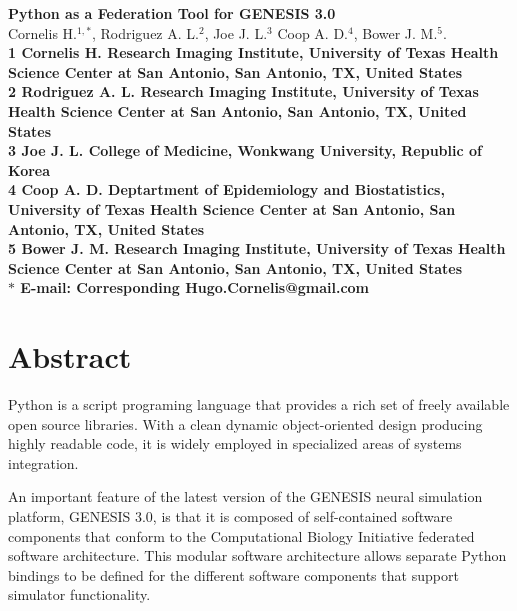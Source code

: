 \documentclass[10pt]{article}
\date{}
\begin{document}
\begin{flushleft}
{\Large
\textbf{Python as a Federation Tool for GENESIS 3.0}
}
\\
Cornelis H.$^{1,\ast}$, 
Rodriguez A. L.$^{2}$, 
Joe J. L.$^{3}$
Coop A. D.$^{4}$,
Bower J. M.$^{5}$.
\\
\bf{1} Cornelis H. Research Imaging Institute, University of Texas Health Science Center at San Antonio, San Antonio, TX, United States
\\
\bf{2} Rodriguez A. L. Research Imaging Institute, University of Texas Health Science Center at San Antonio, San Antonio, TX, United States
\\
\bf{3} Joe J. L. College of Medicine, Wonkwang University, Republic of Korea
\\
\bf{4} Coop A. D. Deptartment of Epidemiology and Biostatistics, University of Texas Health Science Center at San Antonio, San Antonio, TX, United States
\\
\bf{5} Bower J. M. Research Imaging Institute, University of Texas Health Science Center at San Antonio, San Antonio, TX, United States
\\
$\ast$ E-mail: Corresponding Hugo.Cornelis@gmail.com
\end{flushleft}

\section*{Abstract}
Python is a script programing language that provides a rich set of freely available open source libraries.
With a clean dynamic object-oriented design producing highly readable code,
it is widely employed in specialized areas of systems
integration.

An important feature of the latest version of the GENESIS neural simulation platform, GENESIS 3.0, is that it is composed of self-contained software components that conform to the Computational Biology Initiative federated software architecture.
This modular software architecture allows separate Python bindings to be defined for the different software components that support simulator functionality.
\end{document}
